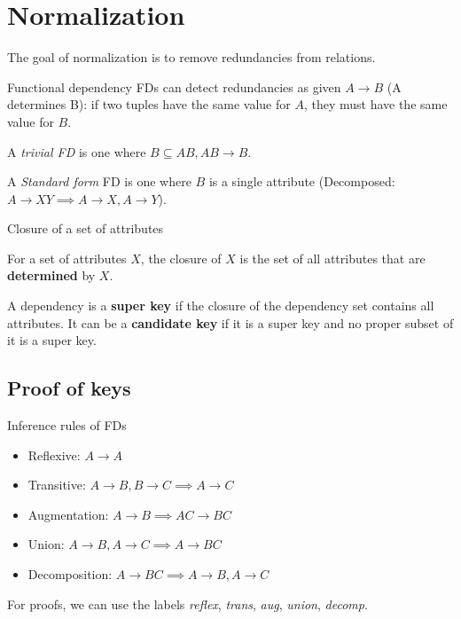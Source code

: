 \section{Normalization}

The goal of normalization is to remove redundancies from relations.

\begin{definition}
    {Functional dependency}
    FDs can detect redundancies as given $A \to B$ (A determines B): if two tuples have the same value for $A$, they must have the same value for $B$.

    A \textit{trivial FD} is one where $B \subseteq AB, AB \to B$.

    A \textit{Standard form} FD is one where $B$ is a single attribute (Decomposed: $A \to XY \implies A \to X, A \to Y$).
\end{definition}

\begin{definition}
    {Closure of a set of attributes}

    For a set of attributes $X$, the closure of $X$ is the set of all attributes that are \textbf{determined} by $X$.

    A dependency is a \textbf{super key} if the closure of the dependency set contains all attributes. It can be a \textbf{candidate key} if it is a super key and no proper subset of it is a super key.
\end{definition}

\subsection{Proof of keys}

\begin{theorem}
    {Inference rules of FDs}
    \begin{itemize}
        \item Reflexive: $A \to A$
        \item Transitive: $A \to B, B \to C \implies A \to C$
        \item Augmentation: $A \to B \implies AC \to BC$
        \item Union: $A \to B, A \to C \implies A \to BC$
        \item Decomposition: $A \to BC \implies A \to B, A \to C$
    \end{itemize}

    For proofs, we can use the labels \textit{reflex}, \textit{trans}, \textit{aug}, \textit{union}, \textit{decomp}.
\end{theorem}


